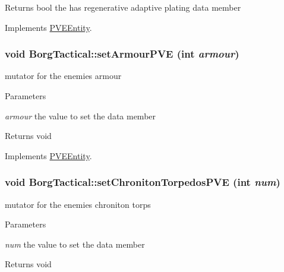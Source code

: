 \begin{DoxyReturn}{Returns}
bool the has regenerative adaptive plating data member 
\end{DoxyReturn}


Implements \hyperlink{classPVEEntity}{PVEEntity}.

\hypertarget{classBorgTactical_a1981835f6fd3b9f4cd8b98de13db73fd}{
\subsubsection[{setArmourPVE}]{\setlength{\rightskip}{0pt plus 5cm}void BorgTactical::setArmourPVE (int {\em armour})}}
\label{d0/d4e/classBorgTactical_a1981835f6fd3b9f4cd8b98de13db73fd}
mutator for the enemies armour


\begin{DoxyParams}{Parameters}
\item[{\em armour}]the value to set the data member\end{DoxyParams}
\begin{DoxyReturn}{Returns}
void 
\end{DoxyReturn}


Implements \hyperlink{classPVEEntity}{PVEEntity}.

\hypertarget{classBorgTactical_ad96d089c1faa7171175621aaa2861dfa}{
\subsubsection[{setChronitonTorpedosPVE}]{\setlength{\rightskip}{0pt plus 5cm}void BorgTactical::setChronitonTorpedosPVE (int {\em num})}}
\label{d0/d4e/classBorgTactical_ad96d089c1faa7171175621aaa2861dfa}
mutator for the enemies chroniton torps


\begin{DoxyParams}{Parameters}
\item[{\em num}]the value to set the data member\end{DoxyParams}
\begin{DoxyReturn}{Returns}
void 
\end{DoxyReturn}


